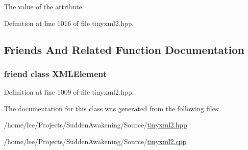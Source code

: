 The value of the attribute. 



Definition at line 1016 of file tinyxml2.\-hpp.



\subsection{Friends And Related Function Documentation}
\hypertarget{classtinyxml2_1_1_x_m_l_attribute_ac2fba9b6e452829dd892f7392c24e0eb}{
\subsubsection[{X\-M\-L\-Element}]{\setlength{\rightskip}{0pt plus 5cm}friend class {\bf X\-M\-L\-Element}\hspace{0.3cm}{\ttfamily [friend]}}}\label{classtinyxml2_1_1_x_m_l_attribute_ac2fba9b6e452829dd892f7392c24e0eb}


Definition at line 1009 of file tinyxml2.\-hpp.



The documentation for this class was generated from the following files\-:\begin{DoxyCompactItemize}
\item 
/home/lee/\-Projects/\-Sudden\-Awakening/\-Source/\hyperlink{tinyxml2_8hpp}{tinyxml2.\-hpp}\item 
/home/lee/\-Projects/\-Sudden\-Awakening/\-Source/\hyperlink{tinyxml2_8cpp}{tinyxml2.\-cpp}\end{DoxyCompactItemize}
